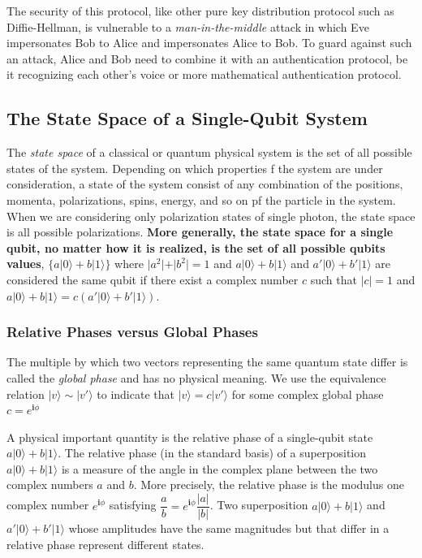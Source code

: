 \documentclass[12pt,a4paper]{report}
\begin{document}
The security of this protocol, like other pure key distribution protocol such as Diffie-Hellman, is vulnerable to a \textit{man-in-the-middle} attack in which Eve impersonates Bob to Alice and impersonates Alice to Bob. To guard against such an attack, Alice and Bob need to combine it with an authentication protocol, be it recognizing each other's voice or more mathematical authentication protocol.

\subsection{The State Space of a Single-Qubit System}
The \textit{state space} of a classical or quantum physical system is the set of all possible states of the system. Depending on which properties f the system are under consideration, a state of the system consist of any combination of the positions, momenta, polarizations, spins, energy, and so on pf the particle in the system. When we are considering only polarization states of single photon, the state space is all possible polarizations. \textbf{More generally, the state space for a single qubit, no matter how it is realized, is the set of all possible qubits values},
$ \lbrace a \vert 0 \rangle + b \vert 1 \rangle \rbrace $
where
$ \vert a^{2} \vert + \vert b^{2} \vert = 1 $
and
$ a \vert 0 \rangle + b \vert 1 \rangle $
and
$ a' \vert 0 \rangle + b' \vert 1 \rangle $
are considered the same qubit if there exist a complex number $c$ such that $ \vert c \vert = 1 $ and
$ a \vert 0 \rangle + b \vert 1 \rangle = c ( a' \vert 0 \rangle + b' \vert 1 \rangle ) $.

\subsubsection{Relative Phases versus Global Phases}
The multiple by which two vectors representing the same quantum state differ is called the \textit{global phase} and has no physical meaning. We use the equivalence relation
$ \vert v \rangle \sim \vert v' \rangle $
to indicate that 
$ \vert v \rangle = c \vert v' \rangle $
for some complex global phase
$ c = e^{\textbf{i}\phi} $

A physical important quantity is the relative phase of a single-qubit state
$ a \vert 0 \rangle + b \vert 1 \rangle $.
The relative phase (in the standard basis) of a superposition
$ a \vert 0 \rangle + b \vert 1 \rangle $
is a measure of the angle in the complex plane between the two complex numbers $a$ and $b$.
More precisely, the relative phase is the modulus one complex number
$ e^{\textbf{i} \phi } $
satisfying
$ \dfrac{a}{b} = e^{\textbf{i} \phi } \dfrac{ \vert a \vert }{ \vert b \vert } $.
Two superposition
$ a \vert 0 \rangle + b \vert 1 \rangle $
and
$ a' \vert 0 \rangle + b' \vert 1 \rangle $
whose amplitudes have the same magnitudes but that differ in a relative phase represent different states.
\end{document}

